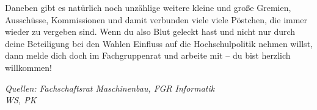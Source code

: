 Daneben gibt es natürlich noch unzählige weitere kleine und große Gremien, Ausschüsse, Kommissionen und damit verbunden viele viele Pöstchen, die immer wieder zu vergeben sind. Wenn du also Blut geleckt hast und nicht nur durch deine Beteiligung bei den Wahlen Einfluss auf die Hochschulpolitik nehmen willst, dann melde dich doch im Fachgruppenrat und arbeite mit -- du bist herzlich willkommen!

\emph{Quellen: Fachschaftsrat Maschinenbau, FGR Informatik\\WS, PK}
